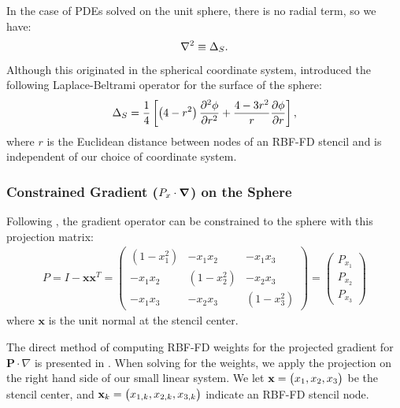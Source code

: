 \documentclass[11pt]{report}
\begin{document}
{In the case of PDEs solved on the unit sphere, there is no radial term, so we have:
\begin{align}
\nabla^2 \equiv \Delta_S .
\end{align}
Although this originated in the spherical coordinate system, \cite{WrightFlyerYuen10} introduced the following Laplace-Beltrami operator for the surface of the sphere: 
\begin{align*} 
\Delta_S = \frac{1}{4} \left[ \left(4-r^2\right) \frac{\partial^2 \phi}{\partial r^2} + \frac{4-3r^2}{r} \frac{\partial \phi}{\partial r} \right],
\end{align*} 
where $r$ is the Euclidean distance between nodes of an RBF-FD stencil and is independent of our choice of coordinate system. 

\subsubsection{Constrained Gradient ($P_{x} \cdot \grad$) on the Sphere}

Following \cite{FlyerWright09, FlyerLehto11}, the gradient operator can be constrained to the sphere with this projection matrix: 
\begin{align}
P = I - \mathbf{x} \mathbf{x}^T =  \begin{pmatrix} 
(1-x_1^2) & -x_1 x_2 & -x_1 x_3 \\
-x_1 x_2 & (1-x_2^2) & -x_2 x_3 \\ 
-x_1 x_3 & -x_2 x_3 & (1-x_3^2) 
\end{pmatrix} = \begin{pmatrix} P_{x_1} \\ P_{x_2} \\ P_{x_3} \end{pmatrix}
\label{eq:project_gradient}
\end{align}
where $\mathbf{x}$ is the unit normal at the stencil center. 


The direct method of computing RBF-FD weights for the projected gradient for $\mathbf{P} \cdot \nabla $ is presented in \cite{FlyerWright09}. When solving for the weights, we apply the projection on the right hand side of our small linear system. We let $\mathbf{x} = \begin{pmatrix} x_1, x_2, x_3 \end{pmatrix} $ be the stencil center, and $\mathbf{x}_k=\begin{pmatrix} x_{1,k}, x_{2,k}, x_{3,k}\end{pmatrix}$ indicate an RBF-FD stencil node. 

}
\end{document}
